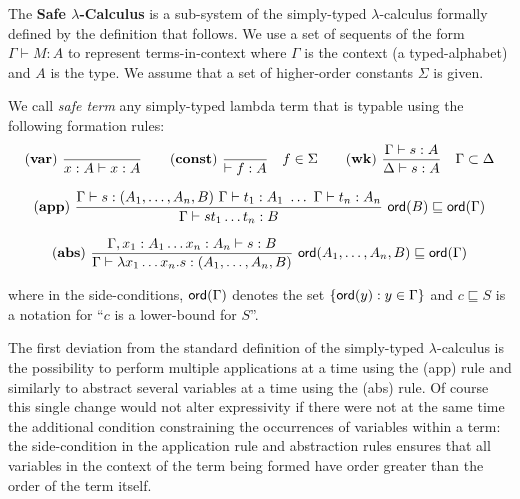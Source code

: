 \documentclass{llncs}
\newcommand\dps{\displaystyle}
\newcommand\rulef[2]{\frac{\dps #1}{#2}}
\newcommand\ord[1]{{\sf ord}(#1)}
\newcommand{\rulename}[1]{\mathbf{(#1)}}
\begin{document}
The \textbf{Safe $\lambda$-Calculus} is a sub-system of the simply-typed $\lambda$-calculus formally defined by the definition that follows.
We use a set of sequents of the form $\Gamma \vdash M : A$ to represent
terms-in-context where $\Gamma$ is the context (a typed-alphabet) and $A$ is the type. We assume that a set
of higher-order constants $\Sigma$ is given.

\begin{definition}
We call \emph{safe term} any simply-typed lambda term that is typable using the following
formation rules:
$$ \rulename{var} \   \rulef{}{x : A\vdash x : A}
\qquad  \rulename{const} \   \rulef{}{\vdash f : A} \quad f \in \Sigma
\qquad  \rulename{wk} \   \rulef{\Gamma \vdash s : A}{\Delta \vdash s : A} \quad \Gamma \subset \Delta$$

$$ \rulename{app} \  \rulef{\Gamma \vdash s : (A_1,\ldots,A_n,B)
                                        \ \Gamma \vdash t_1 : A_1
                                        \  \ldots\  \Gamma \vdash t_n : A_n }
                                   {\Gamma  \vdash s t_1 \ldots t_n : B}
                                    \
                                   \ord{B} \sqsubseteq \ord{\Gamma}$$

$$ \rulename{abs} \   \rulef{\Gamma, x_1 : A_1 \ldots x_n : A_n \vdash s : B}
                                   {\Gamma  \vdash \lambda x_1 \ldots x_n . s : (A_1, \ldots ,A_n,B)} \
                                   \ord{A_1, \ldots ,A_n,B} \sqsubseteq \ord{\Gamma}$$

where in the side-conditions, $\ord{\Gamma}$ denotes the set $\{ \ord{y} : y \in \Gamma \}$ and $c \sqsubseteq S$ is a notation for
``$c$ is a lower-bound for $S$''.
\end{definition}

The first deviation from the standard definition of the simply-typed $\lambda$-calculus is the possibility to perform multiple applications at a time using the {\sf (app)} rule and similarly to abstract several variables at a time using the {\sf (abs)} rule.
Of course this single change would not alter expressivity if there were not at the same time the additional condition
constraining the occurrences of variables within a term:  the side-condition in the application rule and abstraction rules ensures that all variables in the context of the term being formed have order greater than the order of the term itself.
\end{document}

